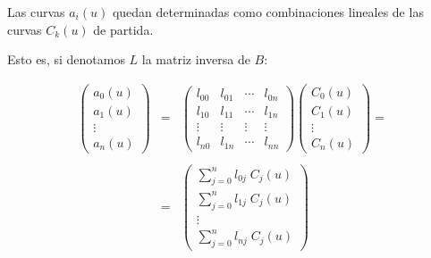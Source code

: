 \documentclass[ebook,oneside]{memoir}
\begin{document}
Las curvas $a_i(u)$ quedan determinadas como combinaciones lineales de las curvas $C_k(u)$ de partida.

Esto es, si denotamos $L$ la matriz inversa de $B$:

\vspace{0.5cm}

$$\begin{array}{ccl}
\left(
\begin{array}{c} a_0(u)\\a_1(u) \\
\vdots \\ a_n(u)
\end{array}\right)&=&\left(
\begin{array}{cccc} l_{00}&l_{01}& \cdots&
l_{0n}\\l_{10}&l_{11}& \cdots& l_{1n}\\\vdots& \vdots&\vdots& \vdots\\
l_{n0}&l_{1n}& \cdots& l_{nn}
\end{array}\right) \left(
\begin{array}{c} C_0(u)\\C_1(u) \\
\vdots \\ C_n(u)
\end{array}\right)=\\ & & \\
&=&\left(
\begin{array}{c} \sum_{j=0}^n l_{0j} \;C_j(u)\\\sum_{j=0}^n l_{1j}\;C_j(u) \\
\vdots \\ \sum_{j=0}^n l_{nj}\; C_j(u)
\end{array}\right)
\end{array}$$
\end{document}
